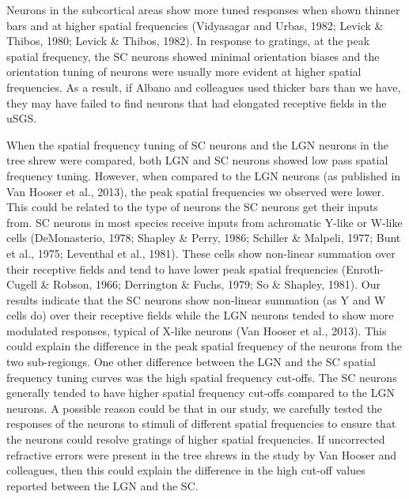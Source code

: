 Neurons in the subcortical areas show more tuned responses when shown
thinner bars and at higher spatial frequencies (Vidyasagar and Urbas,
1982; Levick \& Thibos, 1980; Levick \& Thibos, 1982). In response to
gratings, at the peak spatial frequency, the SC neurons showed minimal
orientation biases and the orientation tuning of neurons were usually
more evident at higher spatial frequencies. As a result, if Albano and
colleagues used thicker bars than we have, they may have failed to find
neurons that had elongated receptive fields in the uSGS.

When the spatial frequency tuning of SC neurons and the LGN neurons in
the tree shrew were compared, both LGN and SC neurons showed low pass
spatial frequency tuning. However, when compared to the LGN neurons (as
published in Van Hooser et al., 2013), the peak spatial frequencies we
observed were lower. This could be related to the type of neurons the SC
neurons get their inputs from. SC neurons in most species receive inputs
from achromatic Y-like or W-like cells (DeMonasterio, 1978; Shapley \&
Perry, 1986; Schiller \& Malpeli, 1977; Bunt et al., 1975; Leventhal et
al., 1981). These cells show non-linear summation over their receptive
fields and tend to have lower peak spatial frequencies (Enroth-Cugell \&
Robson, 1966; Derrington \& Fuchs, 1979; So \& Shapley, 1981). Our
results indicate that the SC neurons show non-linear summation (as Y and
W cells do) over their receptive fields while the LGN neurons tended to
show more modulated responses, typical of X-like neurons (Van Hooser et
al., 2013). This could explain the difference in the peak spatial
frequency of the neurons from the two sub-regiongs. One other difference
between the LGN and the SC spatial frequency tuning curves was the high
spatial frequency cut-offs. The SC neurons generally tended to have
higher spatial frequency cut-offs compared to the LGN neurons. A
possible reason could be that in our study, we carefully tested the
responses of the neurons to stimuli of different spatial frequencies to
ensure that the neurons could resolve gratings of higher spatial
frequencies. If uncorrected refractive errors were present in the tree
shrews in the study by Van Hooser and colleagues, then this could
explain the difference in the high cut-off values reported between the
LGN and the SC.

